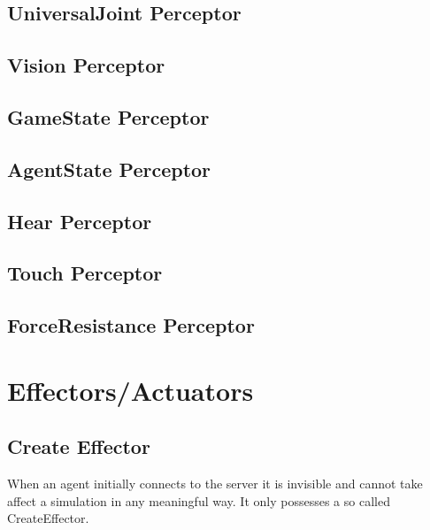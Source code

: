 \subsection{UniversalJoint Perceptor} 

\subsection{Vision Perceptor}



\subsection{GameState Perceptor}
\subsection{AgentState Perceptor}
\subsection{Hear Perceptor}
\subsection{Touch Perceptor}
\subsection{ForceResistance Perceptor}

\section{Effectors/Actuators}



\subsection{Create Effector}

When an agent initially connects to the server it is invisible and
cannot take affect a simulation in any meaningful way. It only
possesses a so called CreateEffector.

